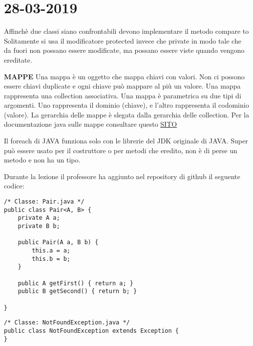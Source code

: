 

\newpage
\section{28-03-2019}
\noindent Affinchè due classi siano confrontabili devono implementare il metodo compare to \newline
Solitamente si usa il modificatore protected invece che private in modo tale che da fuori non possano essere modificate, ma possano essere viste quando vengono ereditate. \newline

\noindent \textbf{MAPPE}\newline
Una mappa è un oggetto che mappa chiavi con valori. Non ci possono essere chiavi duplicate e ogni chiave può mappare al più un valore. \newline
Una mappa rappresenta una collection associativa. \newline
Una mappa è parametrica su due tipi di argomenti. Uno rappresenta il dominio (chiave), e l'altro rappresenta il codominio (valore). La gerarchia delle mappe è slegata dalla gerarchia delle collection. \newline
Per la documentazione java sulle mappe consultare questo \href{https://docs.oracle.com/javase/8/docs/api/java/util/Map.html }{SITO}

\noindent Il foreach di JAVA funziona solo con le librerie del JDK originale di JAVA.\newline
Super può essere usato per il costruttore o per metodi che eredito, non è di perse un metodo e non ha un tipo.

\noindent Durante la lezione il professore ha aggiunto nel repository di github il seguente codice: 


\begin{lstlisting}[basicstyle=\small,]
/* Classe: Pair.java */
public class Pair<A, B> {
    private A a;
    private B b;

    public Pair(A a, B b) {
        this.a = a;
        this.b = b;
    }

    public A getFirst() { return a; }
    public B getSecond() { return b; }

}
\end{lstlisting}

\begin{lstlisting}[basicstyle=\small,]
/* Classe: NotFoundException.java */
public class NotFoundException extends Exception {
}
\end{lstlisting}

